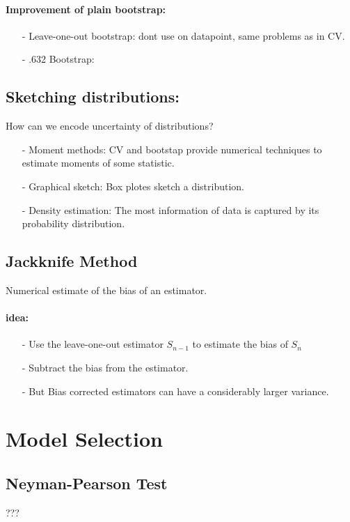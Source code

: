 \paragraph{Improvement of plain bootstrap:}
\begin{itemize}
    \item[-]Leave-one-out bootstrap: dont use on datapoint, same problems as in CV.
    \item[-].632 Bootstrap: 
\end{itemize}{}

\subsection{Sketching distributions:}
How can we encode uncertainty of distributions?
\begin{itemize}
    \item[-]Moment methods: CV and bootstap provide numerical techniques to estimate moments of some statistic.
    \item[-]Graphical sketch: Box plotes sketch a distribution.
    \item[-]Density estimation: The most information of data is captured by its probability distribution.
\end{itemize}{}

\subsection{Jackknife Method}
Numerical estimate of the bias of an estimator.

\paragraph{idea:}
\begin{itemize}
    \item[-]Use the leave-one-out estimator $S_{n-1}$ to estimate the bias of $S_n$
    \item[-]Subtract the bias from the estimator.
    \item[-]But Bias corrected estimators can have a considerably larger variance.
\end{itemize}

\section{Model Selection}

\subsection{Neyman-Pearson Test}
???

